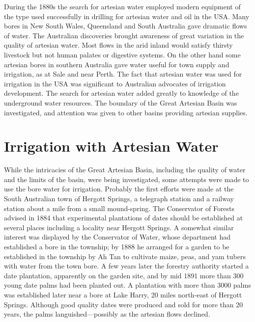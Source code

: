 During the 1880s the search for artesian water employed modern
equipment of the type used successfully in drilling for artesian water
and oil in the USA.  Many bores in New South Wales,
Queensland and South Australia gave dramatic flows of water.  The
Australian discoveries brought awareness of great variation in the
quality of artesian water.  Most flows in the arid inland would
satisfy thirsty livestock but not human palates or digestive systems.
On the other hand some artesian bores in southern Australia gave water
useful for town supply and irrigation, as at Sale and near Perth.  The
fact that artesian water was used for irrigation in the USA
 was significant to Australian advocates of irrigation
development.  The search for artesian water added greatly to knowledge
of the underground water resources.  The boundary of the Great
Artesian Basin was investigated, and attention was given to other
basins providing artesian supplies.

\section*{Irrigation with Artesian Water}

While the intricacies of the Great Artesian Basin, including the
quality of water and the limits of the basin, were being investigated,
some attempts were made to use the bore water for irrigation.
Probably the first efforts were made at the South Australian town of
Hergott Springs,  a telegraph station and a
railway station about a mile from a small
mound-spring.   The Conservator of Forests advised
in 1884 that experimental plantations of dates should be established
at several places including a locality near Hergott Springs.  A
somewhat similar interest was displayed by the Conservator of Water,
whose department had established a bore in the township; by 1888 he
arranged for a garden to be established in the
township by Ah Tan  to cultivate maize,
peas, and yam tubers with water from the town bore.
A few years later the forestry authority started a date plantation,
apparently on the garden site, and by mid 1891 more than 300 young
date palms had been planted out.  A plantation with more than 3000
palms was established later near a bore at Lake Harry,
 20 miles north-east of Hergott Springs. Although
good quality dates were produced and sold for more than
20 years, the palms languished---possibly as the artesian flows
declined.

